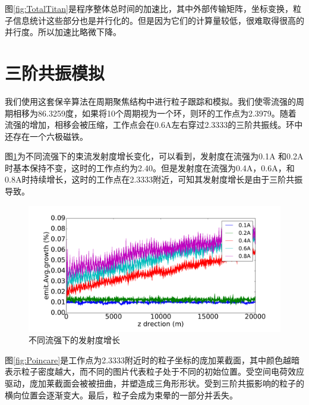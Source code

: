 图\ref{fig:TotalTitan}是程序整体总时间的加速比，其中外部传输矩阵，坐标变换，粒子信息统计这些部分也是并行化的。但是因为它们的计算量较低，很难取得很高的并行度。所以加速比略微下降。

\section{三阶共振模拟}                \label{section:simulation}
我们使用这套保辛算法在周期聚焦结构中进行粒子跟踪和模拟。我们使零流强的周期相移为86.3259度，如果将10个周期视为一个环，则环的工作点为2.3979。随着流强的增加，相移会被压缩，工作点会在0.6A左右穿过2.3333的三阶共振线。环中还存在一个六极磁铁。

图\ref{fig:emitGrowthCompare}为不同流强下的束流发射度增长变化，可以看到，发射度在流强为0.1A 和0.2A 时基本保持不变，这时的工作点约为2.40。但是发射度在流强为0.4A，0.6A，和0.8A时持续增长，这时的工作点在2.3333附近，可知其发射度增长是由于三阶共振导致。

\begin{figure}[!htb]
    \centering
    \includegraphics[width=\textwidth]{plot/emitGrowthCompare.pdf}
    \caption{不同流强下的发射度增长}
    \label{fig:emitGrowthCompare}
\end{figure}

图\ref{fig:Poincare}是工作点为2.3333附近时的粒子坐标的庞加莱截面，其中颜色越暗表示粒子密度越大，而不同的图片代表粒子处于不同的初始位置。受空间电荷效应驱动，庞加莱截面会被被扭曲，并塑造成三角形形状。受到三阶共振影响的粒子的横向位置会逐渐变大。最后，粒子会成为束晕的一部分并丢失。


